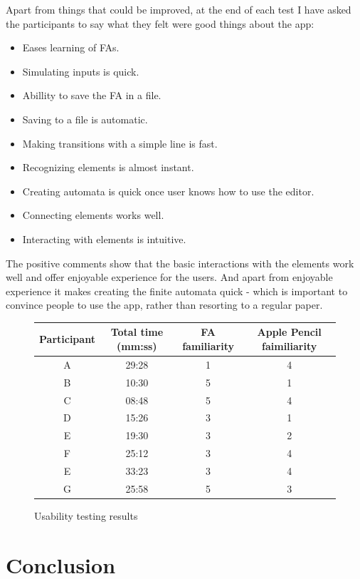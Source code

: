 Apart from things that could be improved, at the end of each test I have asked the participants to say what they felt were good things about the app:
\begin{itemize}
    \item Eases learning of FAs.
    \item Simulating inputs is quick.
    \item Abillity to save the FA in a file.
    \item Saving to a file is automatic.
    \item Making transitions with a simple line is fast.
    \item Recognizing elements is almost instant.
    \item Creating automata is quick once user knows how to use the editor.
    \item Connecting elements works well.
    \item Interacting with elements is intuitive.
\end{itemize}
The positive comments show that the basic interactions with the elements work well and offer enjoyable experience for the users. And apart from enjoyable experience it makes creating the finite automata quick - which is important to convince people to use the app, rather than resorting to a regular paper.

\begin{figure}
\begin{tabular}{||c|c|c|c||} 
    \hline
    Participant & Total time (mm:ss) & FA familiarity & Apple Pencil faimiliarity \\ [0.5ex] 
    \hline\hline
    A & 29:28 & 1 & 4\\ 
    \hline
    B & 10:30 & 5 & 1\\ 
    \hline
    C & 08:48 & 5 & 4\\ 
    \hline
    D & 15:26 & 3 & 1\\ 
    \hline
    E & 19:30 & 3 & 2\\ 
    \hline
    F & 25:12 & 3 & 4\\ 
    \hline
    E & 33:23 & 3 & 4\\ 
    \hline
    G & 25:58 & 5 & 3\\ 
    \hline
\end{tabular}
\caption{Usability testing results}\label{test-results}
\end{figure}

\chapter{Conclusion}

